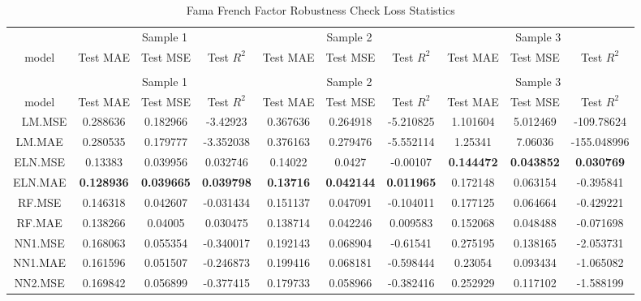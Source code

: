 \begingroup\fontsize{6}{8}\selectfont

\begin{longtable}[t]{cccccccccc}
\caption{\label{tab:}Fama French Factor Robustness Check Loss Statistics}\\
\toprule
\multicolumn{1}{c}{ } & \multicolumn{3}{c}{Sample 1} & \multicolumn{3}{c}{Sample 2} & \multicolumn{3}{c}{Sample 3} \\
\cmidrule(l{3pt}r{3pt}){2-4} \cmidrule(l{3pt}r{3pt}){5-7} \cmidrule(l{3pt}r{3pt}){8-10}
model & Test MAE & Test MSE & Test $R^2$ & Test MAE & Test MSE & Test $R^2$ & Test MAE & Test MSE & Test $R^2$\\
\midrule
\endfirsthead
\caption[]{Fama French Factor Robustness Check Loss Statistics }\\
\toprule
\multicolumn{1}{c}{ } & \multicolumn{3}{c}{Sample 1} & \multicolumn{3}{c}{Sample 2} & \multicolumn{3}{c}{Sample 3} \\
\cmidrule(l{3pt}r{3pt}){2-4} \cmidrule(l{3pt}r{3pt}){5-7} \cmidrule(l{3pt}r{3pt}){8-10}
model & Test MAE & Test MSE & Test $R^2$ & Test MAE & Test MSE & Test $R^2$ & Test MAE & Test MSE & Test $R^2$\\
\midrule
\endhead
\
\endfoot
\bottomrule
\endlastfoot
LM.MSE & 0.288636 & 0.182966 & -3.42923 & 0.367636 & 0.264918 & -5.210825 & 1.101604 & 5.012469 & -109.78624\\
LM.MAE & 0.280535 & 0.179777 & -3.352038 & 0.376163 & 0.279476 & -5.552114 & 1.25341 & 7.06036 & -155.048996\\
ELN.MSE & 0.13383 & 0.039956 & 0.032746 & 0.14022 & 0.0427 & -0.00107 & \textbf{0.144472} & \textbf{0.043852} & \textbf{0.030769}\\
ELN.MAE & \textbf{0.128936} & \textbf{0.039665} & \textbf{0.039798} & \textbf{0.13716} & \textbf{0.042144} & \textbf{0.011965} & 0.172148 & 0.063154 & -0.395841\\
RF.MSE & 0.146318 & 0.042607 & -0.031434 & 0.151137 & 0.047091 & -0.104011 & 0.177125 & 0.064664 & -0.429221\\
\addlinespace
RF.MAE & 0.138266 & 0.04005 & 0.030475 & 0.138714 & 0.042246 & 0.009583 & 0.152068 & 0.048488 & -0.071698\\
NN1.MSE & 0.168063 & 0.055354 & -0.340017 & 0.192143 & 0.068904 & -0.61541 & 0.275195 & 0.138165 & -2.053731\\
NN1.MAE & 0.161596 & 0.051507 & -0.246873 & 0.199416 & 0.068181 & -0.598444 & 0.23054 & 0.093434 & -1.065082\\
NN2.MSE & 0.169842 & 0.056899 & -0.377415 & 0.179733 & 0.058966 & -0.382416 & 0.252929 & 0.117102 & -1.588199\\

\end{longtable}
